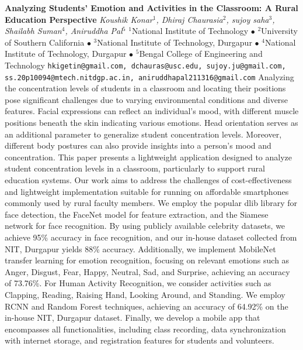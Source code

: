 
    \begin{conf-abstract}[]
        {\textbf{Analyzing Students' Emotion and Activities in the Classroom: A Rural Education Perspective}}
        {\textit{Koushik Konar$^{1}$, Dhiraj Chaurasia$^{2}$, sujoy saha$^{3}$, Shailabh   Suman$^{4}$, Aniruddha  Pal$^{5}$}}
        {$^{1}$National Institute of Technology $\bullet$ $^{2}$University of Southern California $\bullet$ $^{3}$National Institute of Technology, Durgapur $\bullet$ $^{4}$National Institute of Technology, Durgapur $\bullet$ $^{5}$Bengal College of Engineering and Technology}
        {\texttt{hkigetin@gmail.com, dchauras@usc.edu, sujoy.ju@gmail.com, ss.20p10094@mtech.nitdgp.ac.in, aniruddhapal211316@gmail.com}}
        {Analyzing the concentration levels of students in a classroom and locating their positions pose significant challenges due to varying environmental conditions and diverse features. Facial expressions can reflect an individual's mood, with different muscle positions beneath the skin indicating various emotions. Head orientation serves as an additional parameter to generalize student concentration levels. Moreover, different body postures can also provide insights into a person's mood and concentration. This paper presents a lightweight application designed to analyze student concentration levels in a classroom, particularly to support rural education systems. Our work aims to address the challenges of cost-effectiveness and lightweight implementation suitable for running on affordable smartphones commonly used by rural faculty members. We employ the popular dlib library for face detection, the FaceNet model for feature extraction, and the Siamese network for face recognition. By using publicly available celebrity datasets, we achieve 95\% accuracy in face recognition, and our in-house dataset collected from NIT, Durgapur yields 88\% accuracy. Additionally, we implement MobileNet transfer learning for emotion recognition, focusing on relevant emotions such as Anger, Disgust, Fear, Happy, Neutral, Sad, and Surprise, achieving an accuracy of 73.76\%. For Human Activity Recognition, we consider activities such as Clapping, Reading, Raising Hand, Looking Around, and Standing. We employ RCNN and Random Forest techniques, achieving an accuracy of 64.92\% on the in-house NIT, Durgapur dataset. Finally, we develop a mobile app that encompasses all functionalities, including class recording, data synchronization with internet storage, and registration features for students and volunteers.}
    \end{conf-abstract}
        